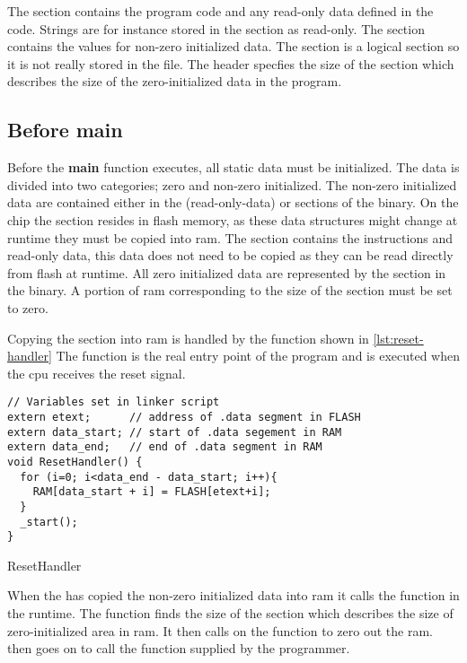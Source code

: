 The  section contains the program code and any read-only data defined in the code.
Strings are for instance stored in the  section as read-only.
The  section contains the values for non-zero initialized data.
The  section is a logical section so it is not really stored in the file.
The header specfies the size of the  section which describes the size of the zero-initialized data in the program.

\subsection{Before main}
\label{sec:before-main}
Before the \textbf{main} function executes, all static data must be initialized.
The data is divided into two categories; zero and non-zero initialized.
The non-zero initialized data are contained either in the  (read-only-data) or  sections of the {\elf} binary.
On the chip the  section resides in flash memory, as these data structures might change at runtime they must be copied into \gls{ram}.
The  section contains the instructions and read-only data, this data does not need to be copied as they can be read directly from flash at runtime.
All zero initialized data are represented by the  section in the {\elf} binary.
A portion of \gls{ram} corresponding to the size of the  section must be set to zero.

Copying the  section into \gls{ram} is handled by the  function shown in \autoref{lst:reset-handler}
The function is the real entry point of the program and is executed when the \gls{cpu} receives the reset signal.

\begin{listing}[H]
\begin{verbatim}
// Variables set in linker script
extern etext;      // address of .data segment in FLASH
extern data_start; // start of .data segement in RAM
extern data_end;   // end of .data segment in RAM
void ResetHandler() {
  for (i=0; i<data_end - data_start; i++){
    RAM[data_start + i] = FLASH[etext+i];
  }
  _start();
}
\end{verbatim}
\caption{ResetHandler}
\label{lst:reset-handler}
\end{listing}

When the  has copied the non-zero initialized data into \gls{ram} it calls the  function in the {\C} runtime.
The  function finds the size of the  section which describes the size of zero-initialized area in \gls{ram}.
It then calls on the  function to zero out the \gls{ram}.
 then goes on to call the {\main} function supplied by the programmer.

